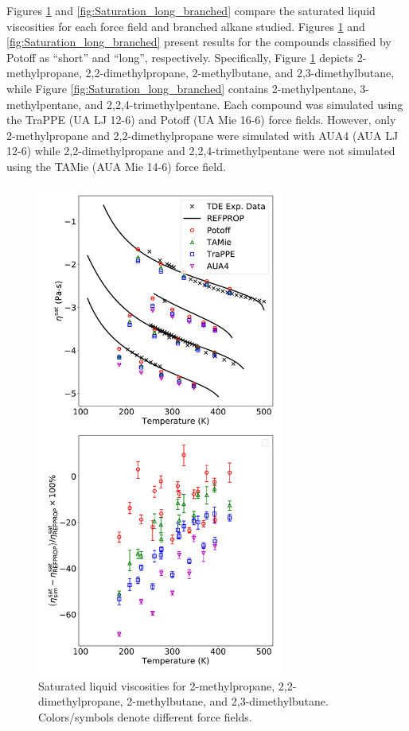 \documentclass[preprint,review,12pt]{elsarticle}
\begin{document}
	Figures \ref{fig:Saturation_short_branched} and \ref{fig:Saturation_long_branched} compare the saturated liquid viscosities for each force field and branched alkane studied. Figures \ref{fig:Saturation_short_branched} and \ref{fig:Saturation_long_branched} present results for the compounds classified by Potoff as ``short'' and ``long'', respectively. Specifically, Figure \ref{fig:Saturation_short_branched} depicts 2-methylpropane, 2,2-dimethylpropane, 2-methylbutane, and 2,3-dimethylbutane, while Figure \ref{fig:Saturation_long_branched} contains 2-methylpentane, 3-methylpentane, and 2,2,4-trimethylpentane. Each compound was simulated using the TraPPE (UA LJ 12-6) and Potoff (UA Mie 16-6) force fields. However, only 2-methylpropane and 2,2-dimethylpropane were simulated with AUA4 (AUA LJ 12-6) while 2,2-dimethylpropane and 2,2,4-trimethylpentane were not simulated using the TAMie (AUA Mie 14-6) force field.
	
	
	\begin{figure}[p!]
		\centering
		\includegraphics[width=3.2in]{compare_force_fields_short_branched.pdf}
		\caption{Saturated liquid viscosities for 2-methylpropane, 2,2-dimethylpropane, 2-methylbutane, and 2,3-dimethylbutane. Colors/symbols denote different force fields.}
		\label{fig:Saturation_short_branched}
	\end{figure} 
	
\end{document}
